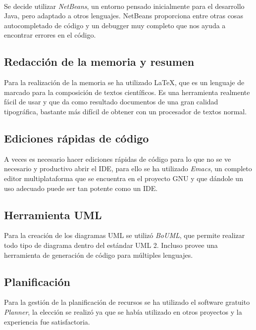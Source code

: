 \documentclass[a4paper,11pt]{article} %
\begin{document}
\paragraph{}
Se decide utilizar {\em NetBeans}, un entorno pensado inicialmente para el desarrollo Java, pero adaptado a otros lenguajes. NetBeans proporciona entre otras cosas autocompletado de código y un debugger muy completo que nos ayuda a encontrar errores en el código.

\subsection{Redacción de la memoria y resumen}

Para la realización de la memoria se ha utilizado \LaTeX, que es un lenguaje de marcado para la composición de textos científicos. Es una herramienta realmente fácil de usar y que da como resultado documentos de una gran calidad tipográfica, bastante más difícil de obtener con un procesador de textos normal.

\subsection{Ediciones rápidas de código}

A veces es necesario hacer ediciones rápidas de código para lo que no se ve necesario y productivo abrir el IDE, para ello se ha utilizado {\em Emacs}, un completo editor multiplataforma que se encuentra en el proyecto GNU y que dándole un uso adecuado puede ser tan potente como un IDE.

\subsection{Herramienta UML}

Para la creación de los diagramas UML se utilizó {\em BoUML}, que permite realizar todo tipo de diagrama dentro del estándar UML 2. Incluso provee una herramienta de generación de código para múltiples lenguajes.

\subsection{Planificación}

Para la gestión de la planificación de recursos se ha utilizado el software gratuito {\em Planner}, la elección se realizó ya que se había utilizado en otros proyectos y la experiencia fue satisfactoria.
\end{document}
